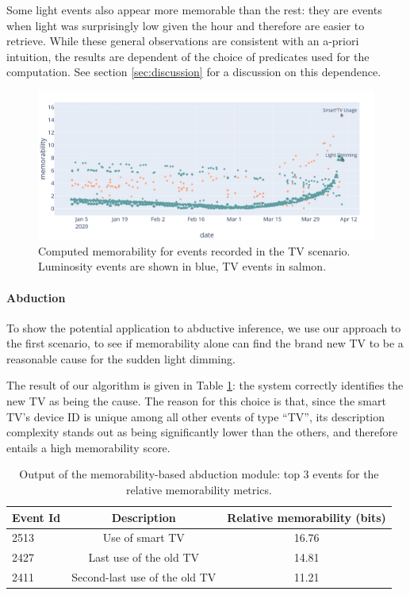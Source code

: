 \documentclass[entropy,article,submit,moreauthors,pdftex]{Definitions/mdpi}
\begin{document}
Some light events also appear more memorable than the rest: they are events when light was surprisingly low given the hour and therefore are easier to retrieve. While these general observations are consistent with an a-priori intuition, the results are dependent of the choice of predicates used for the computation. See section \ref{sec:discussion} for a discussion on this dependence.


\begin{figure}[!ht]
    \centering
    \includegraphics[width=.9\linewidth]{figures/memo_scenar_1.png}
    \caption{Computed memorability for events recorded in the TV scenario. Luminosity events are shown in blue, TV events in salmon.}
    \label{fig:scenar1_complexity}
\end{figure}

\paragraph{Abduction}
To show the potential application to abductive inference, we use our approach to the first scenario, to see if memorability alone can find the brand new TV to be a reasonable cause for the sudden light dimming.

The result of our algorithm is given in Table \ref{tab:abduction_res}: the system correctly identifies the new TV as being the cause. The reason for this choice is that, since the smart TV's device ID is unique among all other events of type ``TV'', its description complexity stands out as being significantly lower than the others, and therefore entails a high memorability score.

\begin{table}
    \centering
    \begin{tabular}{l|c|c}
        Event Id & Description                   & Relative memorability (bits) \\
        \hline
        2513     & Use of smart TV               & 16.76                        \\
        2427     & Last use of the old TV        & 14.81                        \\
        2411     & Second-last use of the old TV & 11.21
    \end{tabular}
    \caption{Output of the memorability-based abduction module: top 3 events for the relative memorability metrics.}
    \label{tab:abduction_res}
\end{table}
\end{document}
